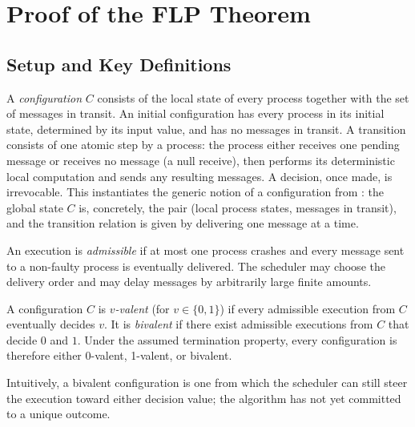 \section{Proof of the FLP Theorem}\label{sec:proof}

\subsection{Setup and Key Definitions}

\begin{smjdefinition}[Configuration]\label{def:flp-configuration}
A \emph{configuration} $C$ consists of the local state of every process together with the set of messages in transit. An initial configuration has every process in its initial state, determined by its input value, and has no messages in transit. A transition consists of one atomic step by a process: the process either receives one pending message or receives no message (a null receive), then performs its deterministic local computation and sends any resulting messages. A decision, once made, is irrevocable. This instantiates the generic notion of a configuration from : the global state $C$ is, concretely, the pair (local process states, messages in transit), and the transition relation is given by delivering one message at a time.
\end{smjdefinition}

\begin{smjdefinition}
An execution is \emph{admissible} if at most one process crashes and every message sent to a non-faulty process is eventually delivered. The scheduler may choose the delivery order and may delay messages by arbitrarily large finite amounts.
\end{smjdefinition}

\begin{smjdefinition}[Valency]
A configuration $C$ is \emph{$v$-valent} (for $v\in\{0,1\}$) if every admissible execution from $C$ eventually decides $v$. It is \emph{bivalent} if there exist admissible executions from $C$ that decide $0$ and $1$. Under the assumed termination property, every configuration is therefore either 0-valent, 1-valent, or bivalent.
\end{smjdefinition}

Intuitively, a bivalent configuration is one from which the scheduler can still steer the execution toward either decision value; the algorithm has not yet committed to a unique outcome.


